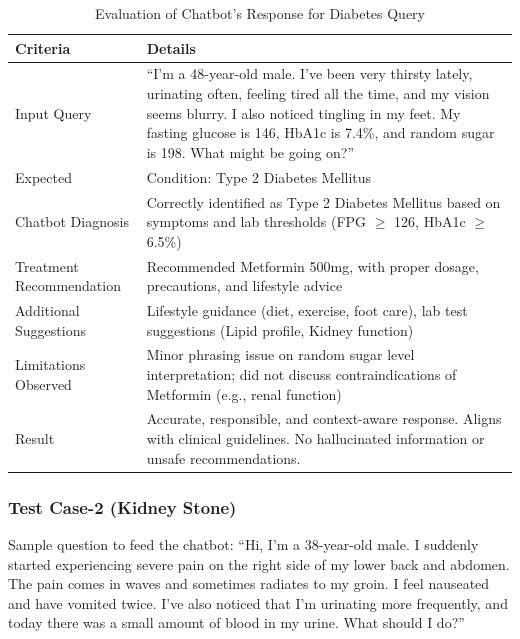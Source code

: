 \documentclass[12pt,a4paper]{report}
\begin{document}
\begin{table}[H]
\centering
\begin{tabular}{|p{3cm}|p{11cm}|}
\hline
\textbf{Criteria} & \textbf{Details} \\ \hline
Input Query & ``I’m a 48-year-old male. I’ve been very thirsty lately, urinating often, feeling tired all the time, and my vision seems blurry. I also noticed tingling in my feet. My fasting glucose is 146, HbA1c is 7.4\%, and random sugar is 198. What might be going on?'' \\ \hline
Expected & Condition: Type 2 Diabetes Mellitus \\ \hline
Chatbot Diagnosis & Correctly identified as Type 2 Diabetes Mellitus based on symptoms and lab thresholds (FPG $\geq$ 126, HbA1c $\geq$ 6.5\%) \\ \hline
Treatment Recommendation & Recommended Metformin 500mg, with proper dosage, precautions, and lifestyle advice \\ \hline
Additional Suggestions & Lifestyle guidance (diet, exercise, foot care), lab test suggestions (Lipid profile, Kidney function) \\ \hline
Limitations Observed & Minor phrasing issue on random sugar level interpretation; did not discuss contraindications of Metformin (e.g., renal function) \\ \hline
Result & Accurate, responsible, and context-aware response. Aligns with clinical guidelines. No hallucinated information or unsafe recommendations. \\ \hline
\end{tabular}
\caption{Evaluation of Chatbot's Response for Diabetes Query}
\label{tab:chatbot_evaluation_diabetes}
\end{table}



\subsubsection{Test Case-2 (Kidney Stone)}
\label{Test Case Kidney Stone}

Sample question to feed the chatbot: ``Hi, I’m a 38-year-old male. I suddenly started experiencing severe pain on the right side of my lower back and abdomen. The pain comes in waves and sometimes radiates to my groin. I feel nauseated and have vomited twice. I’ve also noticed that I’m urinating more frequently, and today there was a small amount of blood in my urine. What should I do?''
\end{document}
